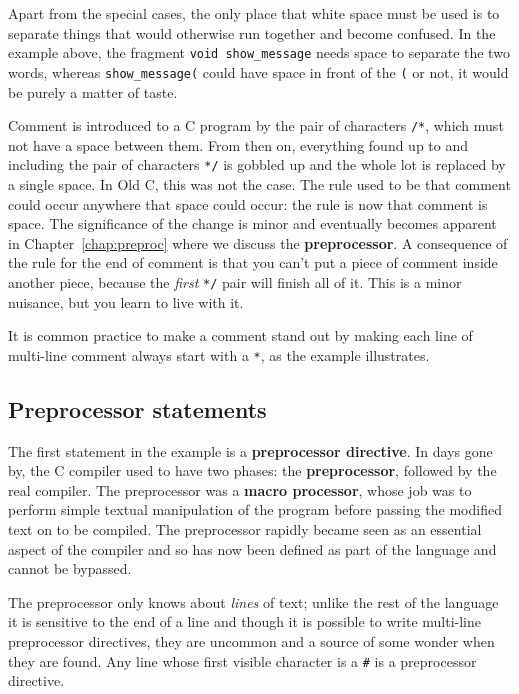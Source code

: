    Apart from the special cases, the only place that white space must be
    used is to separate things that would otherwise run together and become
    confused. In the example above, the fragment \texttt{void show\_message}
    needs space to separate the two words, whereas \texttt{show\_message(}
    could have space in front of the \texttt{(} or not, it would be purely
    a matter of taste.


   Comment is introduced to a C program by the pair of characters
    \texttt{/*}, which must not have a space between them. From then on,
    everything found up to and including the pair of characters \texttt{*/}
    is gobbled up and the whole lot is replaced by a single space. In Old C,
    this was not the case. The rule used to be that comment could occur
    anywhere that space could occur: the rule is now that comment is space. The
    significance of the change is minor and eventually becomes apparent in
    Chapter~\ref{chap:preproc} where we discuss the \textbf{preprocessor}. A
    consequence of the rule for the end of comment is that you can't put a
    piece of comment inside another piece, because the \textit{first}
    \texttt{*/} pair will finish all of it. This is a minor nuisance, but
    you learn to live with it.


   It is common practice to make a comment stand out by making each line of
    multi-line comment always start with a \texttt{*}, as the example
    illustrates.


  

  \subsection{Preprocessor statements}
   

   The first statement in the example is a \textbf{preprocessor
    directive}. In days gone by, the C compiler used to have two phases:
    the \textbf{preprocessor}, followed by the real compiler. The
    preprocessor was a \textbf{macro processor}, whose job was to perform
    simple textual manipulation of the program before passing the modified text
    on to be compiled.  The preprocessor rapidly became seen as an essential
    aspect of the compiler and so has now been defined as part of the language
    and cannot be bypassed.


   The preprocessor only knows about \textit{lines} of text; unlike the rest
    of the language it is sensitive to the end of a line and though it is
    possible to write multi-line preprocessor directives, they are uncommon and
    a source of some wonder when they are found. Any line whose first visible
    character is a \texttt{\#} is a preprocessor directive.


